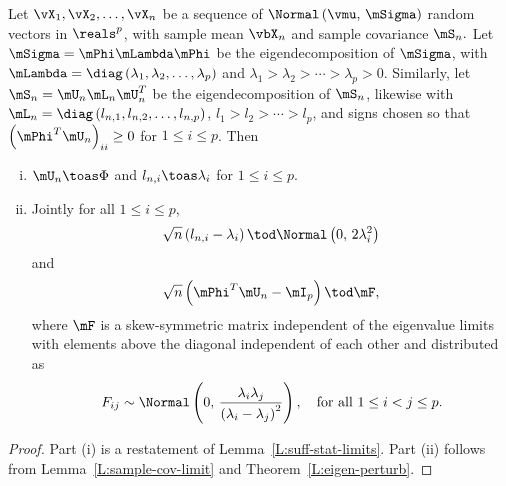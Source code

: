 \begin{theorem}
Let $\vX_1, \vX_2, \ldots, \vX_n$ be a sequence of \iid 
\(
    \Normal \left(
        \vmu, \,
        \mSigma
    \right)
\)
random vectors in $\reals^p$, with sample mean
\(
    \vbX_n
\)
and sample covariance
\(
    \mS_n.
\)
Let $\mSigma = \mPhi \mLambda \mPhi$ be the eigendecomposition
of $\mSigma$, with
\(
    \mLambda = \diag \left(
        \lambda_1,
        \lambda_2,
        \ldots,
        \lambda_p
    \right)
\)
and
\(
    \lambda_1 > \lambda_2 > \cdots > \lambda_p > 0
\).
Similarly, let $\mS_n = \mU_n \mL_n \mU_n^T$ be the eigendecomposition of $\mS_n$, likewise with
\(
    \mL_n = \diag \left(
        l_{n,1},
        l_{n,2},
        \ldots,
        l_{n,p}
    \right)
\),
\(
    l_1 > l_2 > \cdots > l_p
\),
and signs chosen so that
\(
    \left( \mPhi^T \mU_n \right)_{ii} \geq 0
\)
for $1 \leq i \leq p$.  Then
\begin{enumerate}[(i)]
    \item $\mU_n \toas \Phi$ and $l_{n,i} \toas \lambda_i$ for
        $1 \leq i \leq p$.
    \item Jointly for all $1 \leq i \leq p$,
        \[
            \sqrt{n} \left( l_{n,i} - \lambda_i \right) 
            \tod 
            \Normal\left( 0, \, 2 \lambda_i^2 \right)
        \]
        and
        \[
            \sqrt{n} \left( \mPhi^T \mU_n - \mI_p \right) \tod \mF,
        \]
        where $\mF$ is a skew-symmetric matrix independent of the
        eigenvalue limits with elements above the diagonal independent of
        each other and distributed as 
        \[
            F_{ij}
            \sim
            \Normal \left(
                0, \,
                \frac{\lambda_i \lambda_j}
                     {\left( \lambda_i - \lambda_j \right)^2}
            \right),
            \quad
            \text{for all $1 \leq i < j \leq p$.}
        \]
\end{enumerate}
\end{theorem}
\begin{proof}
Part (i) is a restatement of Lemma~\ref{L:suff-stat-limits}.  Part (ii) follows from Lemma~\ref{L:sample-cov-limit} and Theorem~\ref{L:eigen-perturb}.
\end{proof}